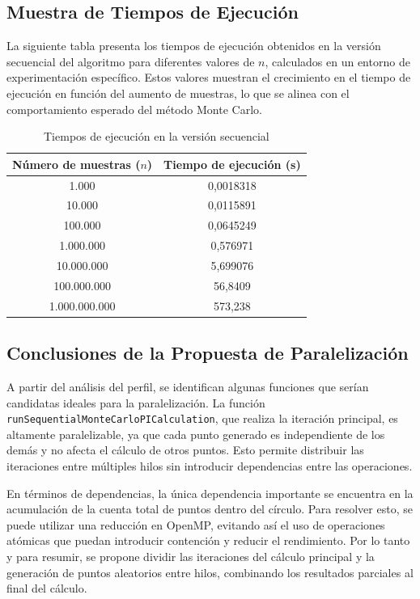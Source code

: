 \documentclass[a4paper, 10pt, onecolumn]{IEEEtran}
\begin{document}
\subsection{Muestra de Tiempos de Ejecución}
La siguiente tabla presenta los tiempos de ejecución obtenidos en la versión secuencial del algoritmo para diferentes valores de $n$, calculados en un entorno de experimentación específico. Estos valores muestran el crecimiento en el tiempo de ejecución en función del aumento de muestras, lo que se alinea con el comportamiento esperado del método Monte Carlo.

\begin{table}[H]
  \centering
  \begin{tabular}{|c|c|}
    \hline
    \textbf{Número de muestras ($n$)} & \textbf{Tiempo de ejecución (s)} \\
    \hline
    1.000         & 0,0018318 \\
    10.000        & 0,0115891 \\
    100.000       & 0,0645249 \\
    1.000.000     & 0,576971 \\
    10.000.000    & 5,699076 \\
    100.000.000   & 56,8409 \\
    1.000.000.000 & 573,238 \\
    \hline
  \end{tabular}
  \caption{Tiempos de ejecución en la versión secuencial}
  \label{tab:sequential_execution_times}
\end{table}

\subsection{Conclusiones de la Propuesta de Paralelización}
A partir del análisis del perfil, se identifican algunas funciones que serían candidatas ideales para la paralelización. La función \texttt{runSequentialMonteCarloPICalculation}, que realiza la iteración principal, es altamente paralelizable, ya que cada punto generado es independiente de los demás y no afecta el cálculo de otros puntos. Esto permite distribuir las iteraciones entre múltiples hilos sin introducir dependencias entre las operaciones.

En términos de dependencias, la única dependencia importante se encuentra en la acumulación de la cuenta total de puntos dentro del círculo. Para resolver esto, se puede utilizar una reducción en OpenMP, evitando así el uso de operaciones atómicas que puedan introducir contención y reducir el rendimiento. Por lo tanto y para resumir, se propone dividir las iteraciones del cálculo principal y la generación de puntos aleatorios entre hilos, combinando los resultados parciales al final del cálculo.
\end{document}
